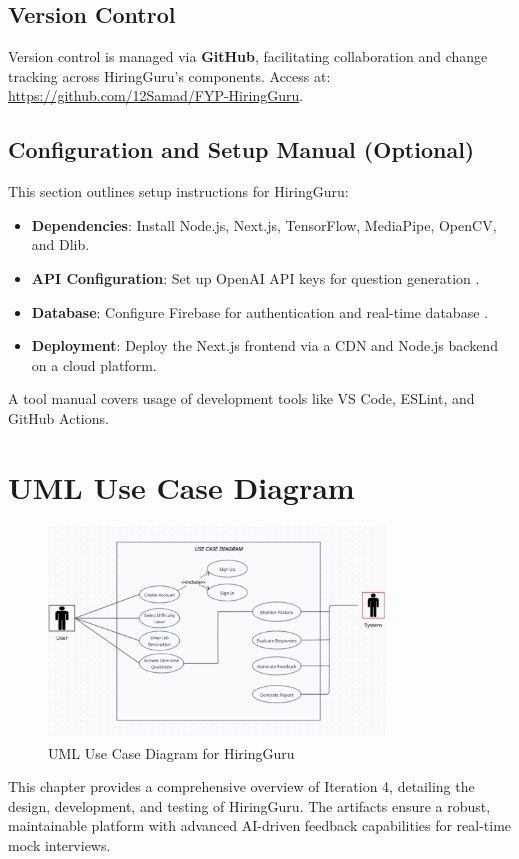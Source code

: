 \subsection{Version Control }
Version control is managed via \textbf{GitHub}, facilitating collaboration and change tracking across HiringGuru’s components. Access at: \url{https://github.com/12Samad/FYP-HiringGuru}.

\subsection{Configuration and Setup Manual (Optional)}
This section outlines setup instructions for HiringGuru:
\begin{itemize}
    \item \textbf{Dependencies}: Install Node.js, Next.js, TensorFlow, MediaPipe, OpenCV, and Dlib.
    \item \textbf{API Configuration}: Set up OpenAI API keys for question generation \cite{openai2023api}.
    \item \textbf{Database}: Configure Firebase for authentication and real-time database \cite{firebase2023docs}.
    \item \textbf{Deployment}: Deploy the Next.js frontend via a CDN and Node.js backend on a cloud platform.
\end{itemize}
A tool manual covers usage of development tools like VS Code, ESLint, and GitHub Actions.

\section{UML Use Case Diagram}
\begin{figure}[h]
  \centering
  \includegraphics[width=0.8\textwidth]{sections/diagrams/UseCase.png}
  \caption{UML Use Case Diagram for HiringGuru}
  \label{fig:use-case}
\end{figure}

This chapter provides a comprehensive overview of Iteration 4, detailing the design, development, and testing of HiringGuru. The artifacts ensure a robust, maintainable platform with advanced AI-driven feedback capabilities for real-time mock interviews.